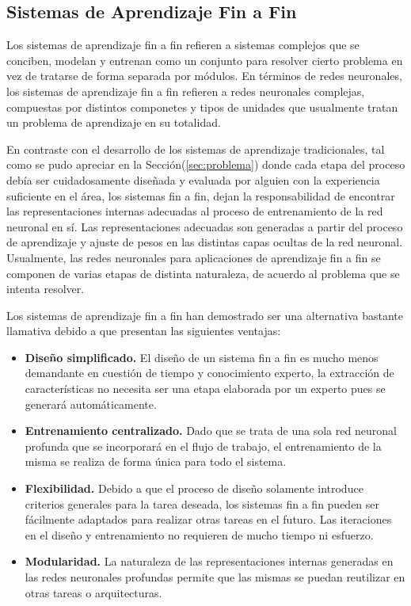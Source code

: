  
    \subsection{Sistemas de Aprendizaje Fin a Fin}
    Los sistemas de aprendizaje fin a fin refieren a sistemas complejos que se conciben, modelan y entrenan 
    como un conjunto para resolver cierto problema en vez de tratarse de forma separada por módulos. En términos
    de redes neuronales, los sistemas de aprendizaje fin a fin refieren a redes neuronales complejas, compuestas 
    por distintos componetes y tipos de unidades que usualmente tratan un problema de aprendizaje en su totalidad.
    
    En contraste con el desarrollo de los sistemas de aprendizaje tradicionales, tal como se pudo apreciar 
    en la Sección(\ref{sec:problema}) donde cada etapa del proceso debía ser cuidadosamente diseñada y evaluada por alguien 
    con la experiencia suficiente en el área, los sistemas fin a fin, dejan la responsabilidad de encontrar 
    las representaciones internas adecuadas al proceso de entrenamiento de la red neuronal en sí. Las representaciones
    adecuadas son generadas a partir del proceso de aprendizaje y ajuste de pesos en las distintas capas ocultas de la red 
    neuronal. Usualmente, las redes neuronales para aplicaciones de aprendizaje fin a fin se componen de varias etapas 
    de distinta naturaleza, de acuerdo al problema que se intenta resolver. 

    Los sistemas de aprendizaje fin a fin han demostrado ser una alternativa bastante llamativa debido a que presentan 
    las siguientes ventajas:

    \begin{itemize}
        \item \textbf{Diseño simplificado.} El diseño de un 
        sistema fin a fin es mucho menos demandante en cuestión de tiempo y conocimiento experto, la extracción de características
        no necesita ser una etapa elaborada por un experto pues se generará automáticamente.
        \item \textbf{Entrenamiento centralizado.} Dado que se trata de una sola red neuronal profunda que se incorporará en 
        el flujo de trabajo, el entrenamiento de la misma se realiza de forma única para todo el sistema.
        \item \textbf{Flexibilidad.} Debido a que el proceso de diseño solamente introduce criterios generales para la tarea 
        deseada, los sistemas fin a fin pueden ser fácilmente adaptados para realizar otras tareas en el futuro. Las iteraciones 
        en el diseño y entrenamiento no requieren de mucho tiempo ni esfuerzo. 
        \item \textbf{Modularidad.} La naturaleza de las representaciones internas generadas en las redes neuronales profundas 
        permite que las mismas se puedan reutilizar en otras tareas o arquitecturas.
    \end{itemize}

